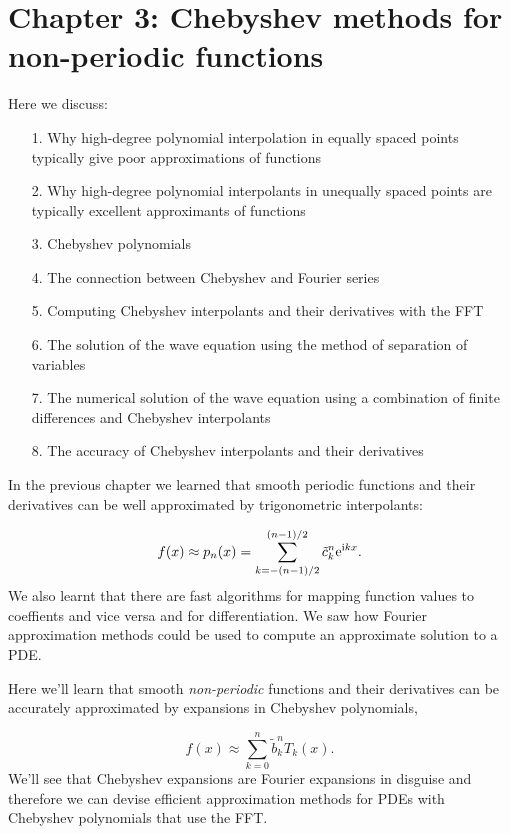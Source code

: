 \documentclass[12pt,a4paper]{article}
\begin{document}
\section{Chapter 3: Chebyshev methods for non-periodic functions}
Here we discuss:

\begin{itemize}
\item[1. ] Why high-degree polynomial interpolation in equally spaced points typically give poor approximations of functions


\item[2. ] Why high-degree polynomial interpolants in unequally spaced points are typically excellent approximants of functions


\item[3. ] Chebyshev polynomials


\item[4. ] The connection between Chebyshev and Fourier series


\item[5. ] Computing Chebyshev interpolants and their derivatives with the FFT


\item[6. ] The solution of the wave equation using the method of separation of variables


\item[7. ] The numerical solution of the wave equation using a combination of finite differences and Chebyshev interpolants


\item[8. ] The accuracy of Chebyshev interpolants and their derivatives

\end{itemize}
In the previous chapter we learned that smooth periodic functions and their derivatives can be well approximated by trigonometric interpolants:

\[
f(x) \approx p_n(x) =  \sum_{k=-(n-1)/2}^{(n-1)/2} \tilde{c}_k^n{\rm e}^{{\rm i}kx}.
\]
We also learnt that there are fast algorithms for mapping function values to coeffients and vice versa and for differentiation.  We saw how Fourier approximation methods could be used to compute an approximate solution to a PDE.

Here we'll learn that smooth \emph{non-periodic} functions and their derivatives can be accurately approximated by expansions in Chebyshev polynomials,

\[
f(x) \approx \sum_{k = 0}^{n}  \tilde{b}_k^n T_k(x).
\]
We'll see that Chebyshev expansions are Fourier expansions in disguise and therefore we can devise efficient approximation methods for PDEs with Chebyshev polynomials that use the FFT. 
\end{document}

